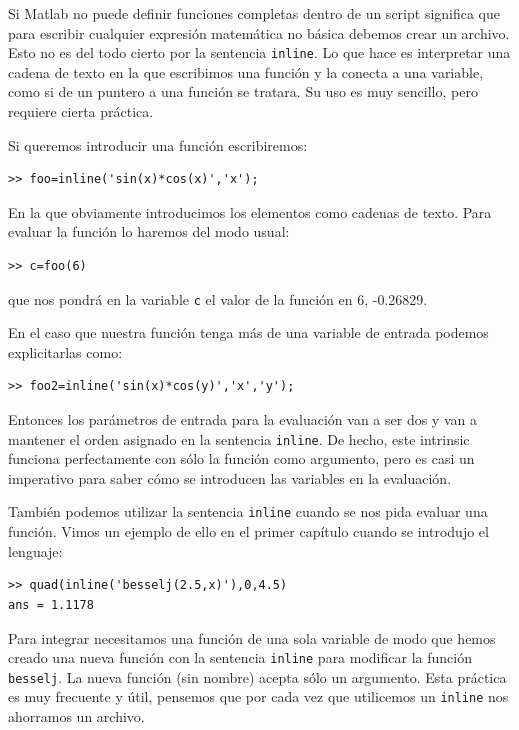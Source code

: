 Si Matlab no puede definir funciones completas dentro de un script
significa que para escribir cualquier expresión matemática no básica
debemos crear un archivo. Esto no es del todo cierto por la sentencia
\texttt{inline}. Lo que hace es interpretar una cadena de texto en la
que escribimos una función y la conecta a una variable, como si de un
puntero a una función se tratara. Su uso es muy sencillo, pero
requiere cierta práctica.

Si queremos introducir una función escribiremos:

\begin{lstlisting}
>> foo=inline('sin(x)*cos(x)','x');
\end{lstlisting}
En la que obviamente introducimos los elementos como cadenas de texto.
Para evaluar la función lo haremos del modo usual:

\begin{lstlisting}
>> c=foo(6)
\end{lstlisting}
que nos pondrá en la variable \texttt{c} el valor de la función en 6,
-0.26829.

En el caso que nuestra función tenga más de una variable de entrada
podemos explicitarlas como:

\begin{lstlisting}
>> foo2=inline('sin(x)*cos(y)','x','y');
\end{lstlisting}
Entonces los parámetros de entrada para la evaluación van a ser dos y
van a mantener el orden asignado en la sentencia \texttt{inline}.  De
hecho, este intrinsic funciona perfectamente con sólo la función como
argumento, pero es casi un imperativo para saber cómo se introducen
las variables en la evaluación.

También podemos utilizar la sentencia \texttt{inline} cuando se nos
pida evaluar una función. Vimos un ejemplo de ello en el primer
capítulo cuando se introdujo el lenguaje:

\begin{lstlisting}
>> quad(inline('besselj(2.5,x)'),0,4.5)
ans = 1.1178
\end{lstlisting}

Para integrar necesitamos una función de una sola variable de modo que
hemos creado una nueva función con la sentencia \texttt{inline} para
modificar la función \texttt{besselj}. La nueva función (sin nombre)
acepta sólo un argumento. Esta práctica es muy frecuente y útil,
pensemos que por cada vez que utilicemos un \texttt{inline} nos
ahorramos un archivo.


